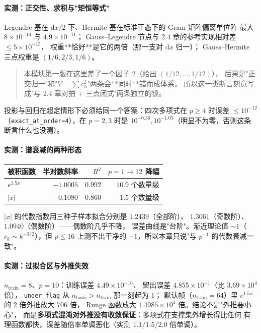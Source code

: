 \paragraph{实测：正交性、求积与"矩恒等式"}
Legendre 基在 $\mathrm dx/2$ 下、Hermite 基在标准正态下的 Gram 矩阵偏离单位阵
最大 $8\times10^{-14}$ 与 $4.9\times10^{-11}$；
Gauss--Legendre 节点与 2.4 章的参考实现相对差 $\le5\times10^{-15}$，
权重**恰好**是它的两倍（那一支对 $\mathrm dx$ 归一）；
Gauss--Hermite 三点权重是 $(1/6,2/3,1/6)$。
\begin{quote}
本模块第一版在这里差了一个因子 $2$（给出 $(1/12,\dots,1/12)$），
后果是"正交归一"和"$V=\sum c_\alpha^2$"两条会**同时**错而成体系。
所以这一类断言刻意写成"与 2.4 章对拍 + 三点闭式"两条独立的锁。
\end{quote}
投影与回归在超定情形下必须给同一个答案：四次多项式在 $p\ge4$ 时误差
$\le10^{-12}$（\texttt{exact\_at\_order=4}），在 $p=2,3$ 时是
$10^{-0.36},10^{-1.05}$（明显不为零，否则这条断言什么也没测）。

\paragraph{实测：谱衰减的两种形态}

\begin{center}
\begin{tabular}{lrrr}
\hline
被积函数 & 半对数斜率 & $R^2$ & $p=1\to12$ 降幅 \\
\hline
$e^{1.5x}$ & $-1.0005$ & $0.992$ & $10.9$ 个数量级 \\
$\lvert x\rvert$ & $-0.1080$ & $0.860$ & $1.5$ 个数量级 \\
\hline
\end{tabular}
\end{center}

$\lvert x\rvert$ 的代数指数用三种子样本拟合分别是 $1.2439$（全部阶）、
$1.3061$（奇数阶）、$1.0940$（偶数阶）——偶数阶几乎不降，
误差曲线是"台阶"。渐近理论值 $\sim1$（$c_k\sim k^{-3/2}$），但 $p\le16$
上测不出干净的 $-1$，所以本章只说"与 $p^{-1}$ 的代数衰减一致"。

\paragraph{实测：过拟合区与外推失效}
$n_{\text{train}}=8$、$p=10$：训练误差 $4.49\times10^{-16}$、
留出误差 $4.855\times10^{-1}$（比 $3.69\times10^{4}$ 倍），
\texttt{under\_flag} 从 $n_{\text{basis}}>n_{\text{train}}$ 那一刻起为 $1$；
默认帧（$n_{\text{train}}=64$）里 $e^{1.5x}$ 的 2 倍外推放大 $706$ 倍，
Runge 函数放大 $1.4985\times10^{4}$ 倍。结论不是"外推要小心"，
而是\textbf{多项式混沌对外推没有收敛保证}：多项式在支撑集外增长得比任何
有理函数都快，误差随倍率单调恶化（实测 $1.1/1.5/2.0$ 倍单调）。

